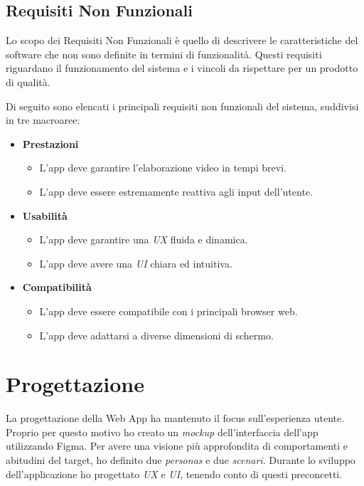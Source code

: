 \subsection{Requisiti Non Funzionali}

Lo scopo dei Requisiti Non Funzionali è quello di descrivere le caratteristiche del software che non sono definite in termini di funzionalità. Questi requisiti riguardano il funzionamento del sistema e i vincoli da rispettare per un prodotto di qualità.

\noindent Di seguito sono elencati i principali requisiti non funzionali del sistema, suddivisi in tre macroaree:

\begin{itemize}
    \item \textbf{Prestazioni}
    \begin{itemize}
        \item L'app deve garantire l'elaborazione video in tempi brevi.
        \item L'app deve essere estremamente reattiva agli input dell'utente.
    \end{itemize}

    \item \textbf{Usabilità}
    \begin{itemize}
        \item L'app deve garantire una \textit{UX} fluida e dinamica.
        \item L'app deve avere una \textit{UI} chiara ed intuitiva. 
    \end{itemize}

    \item \textbf{Compatibilità}
    \begin{itemize}
        \item L'app deve essere compatibile con i principali browser web.
        \item L'app deve adattarsi a diverse dimensioni di schermo.
    \end{itemize}
\end{itemize}

\section{Progettazione}
\label{sec:progettazione}

La progettazione della Web App ha mantenuto il focus sull'esperienza utente. Proprio per questo motivo ho creato un \textit{mockup} dell'interfaccia dell'app utilizzando Figma. 
Per avere una visione più approfondita di comportamenti e abitudini del target, ho definito due \textit{personas} e due \textit{scenari}. Durante lo sviluppo dell'applicazione ho progettato \textit{UX} e \textit{UI}, tenendo conto di questi preconcetti. 







